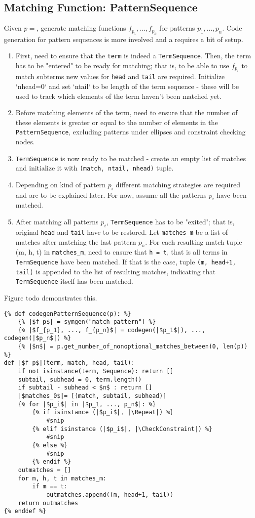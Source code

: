 \subsection{Matching Function: PatternSequence}
Given $p = $\PatternSequence, generate matching functions $f_{p_1}, ..., f_{p_n}$ for patterns $p_1, ..., p_n$. Code generation for pattern sequences is more involved and a requires a bit of setup.

\begin{enumerate}
\item
First, need to ensure that the \texttt{term} is indeed a \texttt{TermSequence}.  Then, the term has to be "entered" to be ready for matching; that is, to be able to use $f_{p_i}$ to match subterms new values for \texttt{head} and \texttt{tail} are required. Initialize `nhead=0` and set `ntail` to be length of the term sequence - these will be used to track which elements of the term haven't been matched yet. 
\item Before matching elements of the term, need to ensure that the number of these elements is greater or equal to the number of elements in the \texttt{PatternSequence}, excluding patterns under ellipses and constraint checking nodes. 
\item \texttt{TermSequence} is now ready to be matched - create an empty list of matches  and initialize it with \texttt{(match, ntail, nhead)} tuple. 
\item 
Depending on kind of pattern $p_i$ different matching strategies are required and are to be explained later. For now, assume all the patterns $p_i$ have been matched.
\item
After matching all patterns $p_i$, \texttt{TermSequence} has to be "exited"; that is, original \texttt{head} and \texttt{tail} have to be restored. Let \texttt{matches\_m} be a list of matches after matching the last pattern $p_n$. For each resulting match tuple (m, h, t) in \texttt{matches\_m}, need to ensure that \texttt{h = t}, that is all terms in \texttt{TermSequence} have been matched. If that is the case, tuple \texttt{(m, head+1, tail)} is appended to the list of resulting matches, indicating that \texttt{TermSequence} itself has been matched.
\end{enumerate}

Figure todo demonstrates this.
\begin{verbatim}
{% def codegenPatternSequence(p): %}
	{% |$f_p$| = symgen("match_pattern") %}
	{% |$f_{p_1}, ..., f_{p_n}$| = codegen(|$p_1$|), ...,  codegen(|$p_n$|) %}
	{% |$n$| = p.get_number_of_nonoptional_matches_between(0, len(p)) %}
def |$f_p$|(term, match, head, tail):
	if not isinstance(term, Sequence): return []
	subtail, subhead = 0, term.length()
	if subtail - subhead < $n$ : return []
	|$matches_0$|= [(match, subtail, subhead)]
	{% for |$p_i$| in |$p_1, ..., p_n$|: %}
		{% if isinstance (|$p_i$|, |\Repeat|) %}
			#snip
		{% elif isinstance (|$p_i$|, |\CheckConstraint|) %}
			#snip
		{% else %}
			#snip
		{% endif %}
	outmatches = []
	for m, h, t in matches_m:
		if m == t:
			outmatches.append((m, head+1, tail))
	return outmatches
{% enddef %}
\end{verbatim}


